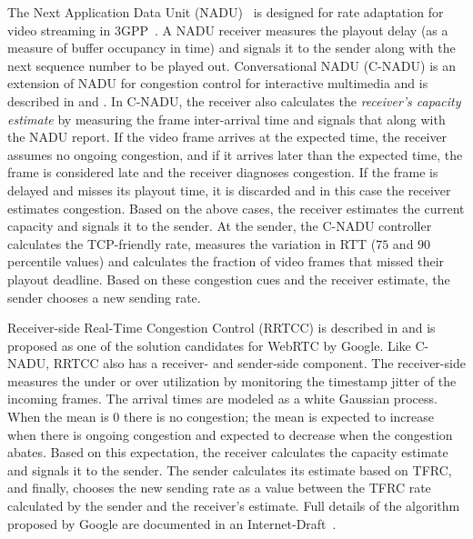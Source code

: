 The Next Application Data Unit (NADU)~\cite{nadu.1070341,nadu.1530486} is designed
for rate adaptation for video streaming in 3GPP~\cite{3gpp.26.234}. A NADU
receiver measures the playout delay (as a measure of buffer occupancy in time)
and signals it to the sender along with the next sequence number to be played
out. Conversational NADU (C-NADU) is an extension of NADU for congestion
control for interactive multimedia and is described in  and
. In C-NADU, the receiver also calculates the
\emph{receiver's capacity estimate} by measuring the frame inter-arrival time
and signals that along with the NADU report. If the video frame arrives at the
expected time, the receiver assumes no ongoing congestion, and if it arrives
later than the expected time, the frame is considered late and the receiver
diagnoses congestion. If the frame is delayed and misses its playout time, it
is discarded and in this case the receiver estimates congestion. Based on the
above cases, the receiver estimates the current capacity and signals it to the
sender. At the sender, the C-NADU controller calculates the TCP-friendly rate,
measures the variation in RTT ($75$ and $90$ percentile values) and calculates
the fraction of video frames that missed their playout deadline. Based on
these congestion cues and the receiver estimate, the sender chooses a new
sending rate.


Receiver-side Real-Time Congestion Control (RRTCC) is described in
\cite{draft.rrtcc} and is proposed as one of the solution candidates for
WebRTC by Google. Like C-NADU, RRTCC also has a receiver- and sender-side
component. The receiver-side measures the under or over utilization by
monitoring the timestamp jitter of the incoming frames. The arrival times are
modeled as a white Gaussian process. When the mean is 0 there is no
congestion; the mean is expected to increase when there is ongoing congestion
and expected to decrease when the congestion abates. Based on this
expectation, the receiver calculates the capacity estimate and signals it to
the sender. The sender calculates its estimate based on TFRC, and finally,
chooses the new sending rate as a value between the TFRC rate calculated by
the sender and the receiver's estimate. Full details of the algorithm proposed by
Google are documented in an Internet-Draft~\cite{draft.rrtcc}.



